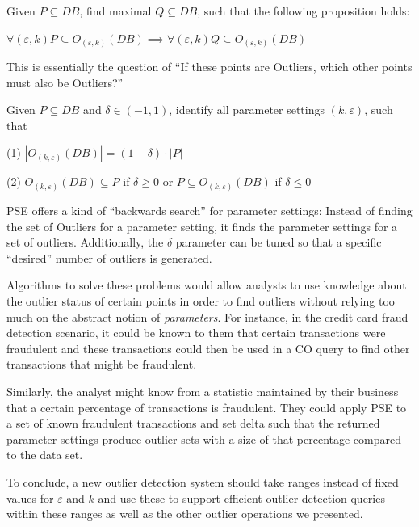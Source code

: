 \documentclass[runningheads]{llncs}
\begin{document}
\begin{definition}

\noindent Given $P\subseteq DB$, find maximal $Q\subseteq DB$, such that the following proposition holds:

\noindent $\forall (\varepsilon,k) P \subseteq O_{(\varepsilon, k)}(DB) \implies \forall (\varepsilon,k)Q\subseteq O_{(\varepsilon, k)}(DB)$
\end{definition}

This is essentially the question of ``If these points are Outliers, which other points must also be Outliers?''

\begin{definition}

\noindent Given $P\subseteq DB$ and $\delta \in (-1,1)$, identify all parameter settings $(k,\varepsilon)$, such that

\noindent(1) $|O_{(k,\varepsilon)}(DB)| = (1 - \delta) \cdot |P|$

\noindent(2) $O_{(k,\varepsilon)}(DB) \subseteq P$ if $\delta \geq 0$ or $P \subseteq O_{(k,\varepsilon)}(DB)$ if $\delta \leq 0$
\end{definition}

PSE offers a kind of ``backwards search'' for parameter settings: Instead of finding the set of Outliers for a parameter setting, it finds the parameter settings for a set of outliers. Additionally, the $\delta$ parameter can be tuned so that a specific ``desired'' number of outliers is generated.

Algorithms to solve these problems would allow analysts to use knowledge about the outlier status of certain points in order to find outliers without relying too much on the abstract notion of \emph{parameters}. For instance, in the credit card fraud detection scenario, it could be known to them that certain transactions were fraudulent and these transactions could then be used in a CO query to find other transactions that might be fraudulent.

Similarly, the analyst might know from a statistic maintained by their business that a certain percentage of transactions is fraudulent. They could apply PSE to a set of known fraudulent transactions and set delta such that the returned parameter settings produce outlier sets with a size of that percentage compared to the data set.

To conclude, a new outlier detection system should take ranges instead of fixed values for $\varepsilon$ and $k$ and use these to support efficient outlier detection queries within these ranges as well as the other outlier operations we presented.
\end{document}
